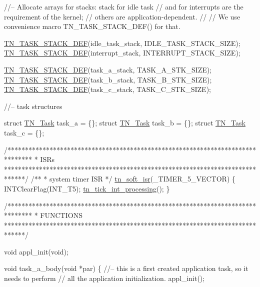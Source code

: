 \begin{DoxyCodeInclude}
\textcolor{comment}{//-- Allocate arrays for stacks: stack for idle task}
\textcolor{comment}{//   and for interrupts are the requirement of the kernel;}
\textcolor{comment}{//   others are application-dependent.}
\textcolor{comment}{//}
\textcolor{comment}{//   We use convenience macro TN\_TASK\_STACK\_DEF() for that.}

\hyperlink{tn__tasks_8h_a120e01d9dddd21ac11827595e88d7c36}{TN\_TASK\_STACK\_DEF}(idle\_task\_stack, IDLE\_TASK\_STACK\_SIZE);
\hyperlink{tn__tasks_8h_a120e01d9dddd21ac11827595e88d7c36}{TN\_TASK\_STACK\_DEF}(interrupt\_stack, INTERRUPT\_STACK\_SIZE);

\hyperlink{tn__tasks_8h_a120e01d9dddd21ac11827595e88d7c36}{TN\_TASK\_STACK\_DEF}(task\_a\_stack, TASK\_A\_STK\_SIZE);
\hyperlink{tn__tasks_8h_a120e01d9dddd21ac11827595e88d7c36}{TN\_TASK\_STACK\_DEF}(task\_b\_stack, TASK\_B\_STK\_SIZE);
\hyperlink{tn__tasks_8h_a120e01d9dddd21ac11827595e88d7c36}{TN\_TASK\_STACK\_DEF}(task\_c\_stack, TASK\_C\_STK\_SIZE);



\textcolor{comment}{//-- task structures}

\textcolor{keyword}{struct }\hyperlink{structTN__Task}{TN\_Task} task\_a = \{\};
\textcolor{keyword}{struct }\hyperlink{structTN__Task}{TN\_Task} task\_b = \{\};
\textcolor{keyword}{struct }\hyperlink{structTN__Task}{TN\_Task} task\_c = \{\};



\textcolor{comment}{/*******************************************************************************}
\textcolor{comment}{ *    ISRs}
\textcolor{comment}{ ******************************************************************************/}
\textcolor{comment}{}
\textcolor{comment}{/**}
\textcolor{comment}{ * system timer ISR}
\textcolor{comment}{ */}
\hyperlink{tn__arch__pic32_8h_a46a860d030e59e2c6aa827ca5ad36a37}{tn\_soft\_isr}(\_TIMER\_5\_VECTOR)
\{
   INTClearFlag(INT\_T5);
   \hyperlink{tn__sys_8h_a944d96c7a5d442d271115b6cb22a085b}{tn\_tick\_int\_processing}();
\}



\textcolor{comment}{/*******************************************************************************}
\textcolor{comment}{ *    FUNCTIONS}
\textcolor{comment}{ ******************************************************************************/}

\textcolor{keywordtype}{void} appl\_init(\textcolor{keywordtype}{void});

\textcolor{keywordtype}{void} task\_a\_body(\textcolor{keywordtype}{void} *par)
\{
   \textcolor{comment}{//-- this is a first created application task, so it needs to perform}
   \textcolor{comment}{//   all the application initialization.}
   appl\_init();


\end{DoxyCodeInclude}
